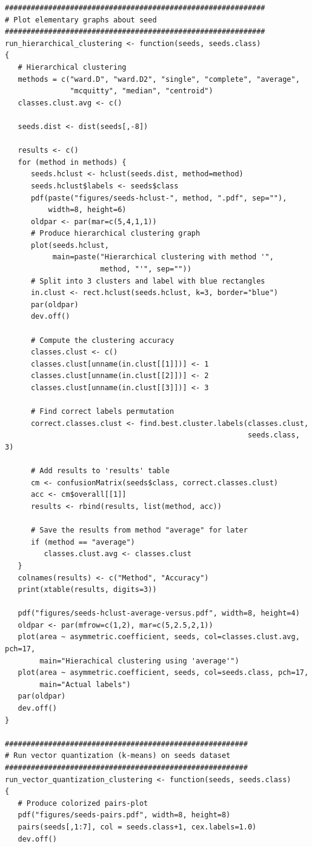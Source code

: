 \documentclass[12pt,article,oneside]{memoir}
\begin{document}
\begin{verbatim}
############################################################
# Plot elementary graphs about seed
############################################################
run_hierarchical_clustering <- function(seeds, seeds.class)
{
   # Hierarchical clustering   
   methods = c("ward.D", "ward.D2", "single", "complete", "average",
               "mcquitty", "median", "centroid")
   classes.clust.avg <- c()
   
   seeds.dist <- dist(seeds[,-8])
   
   results <- c()
   for (method in methods) {
      seeds.hclust <- hclust(seeds.dist, method=method)
      seeds.hclust$labels <- seeds$class
      pdf(paste("figures/seeds-hclust-", method, ".pdf", sep=""),
          width=8, height=6)
      oldpar <- par(mar=c(5,4,1,1))
      # Produce hierarchical clustering graph
      plot(seeds.hclust, 
           main=paste("Hierarchical clustering with method '",
                      method, "'", sep=""))
      # Split into 3 clusters and label with blue rectangles
      in.clust <- rect.hclust(seeds.hclust, k=3, border="blue")
      par(oldpar)
      dev.off()
      
      # Compute the clustering accuracy
      classes.clust <- c()
      classes.clust[unname(in.clust[[1]])] <- 1
      classes.clust[unname(in.clust[[2]])] <- 2
      classes.clust[unname(in.clust[[3]])] <- 3
      
      # Find correct labels permutation
      correct.classes.clust <- find.best.cluster.labels(classes.clust,
                                                        seeds.class, 3)
      
      # Add results to 'results' table
      cm <- confusionMatrix(seeds$class, correct.classes.clust)
      acc <- cm$overall[[1]]
      results <- rbind(results, list(method, acc))
      
      # Save the results from method "average" for later
      if (method == "average")
         classes.clust.avg <- classes.clust
   }
   colnames(results) <- c("Method", "Accuracy")
   print(xtable(results, digits=3))
   
   pdf("figures/seeds-hclust-average-versus.pdf", width=8, height=4)
   oldpar <- par(mfrow=c(1,2), mar=c(5,2.5,2,1))
   plot(area ~ asymmetric.coefficient, seeds, col=classes.clust.avg, pch=17,
        main="Hierachical clustering using 'average'")
   plot(area ~ asymmetric.coefficient, seeds, col=seeds.class, pch=17,
        main="Actual labels")
   par(oldpar)
   dev.off()
}

########################################################
# Run vector quantization (k-means) on seeds dataset
########################################################
run_vector_quantization_clustering <- function(seeds, seeds.class)
{
   # Produce colorized pairs-plot
   pdf("figures/seeds-pairs.pdf", width=8, height=8)
   pairs(seeds[,1:7], col = seeds.class+1, cex.labels=1.0)
   dev.off()
   

\end{verbatim}
\end{document}
